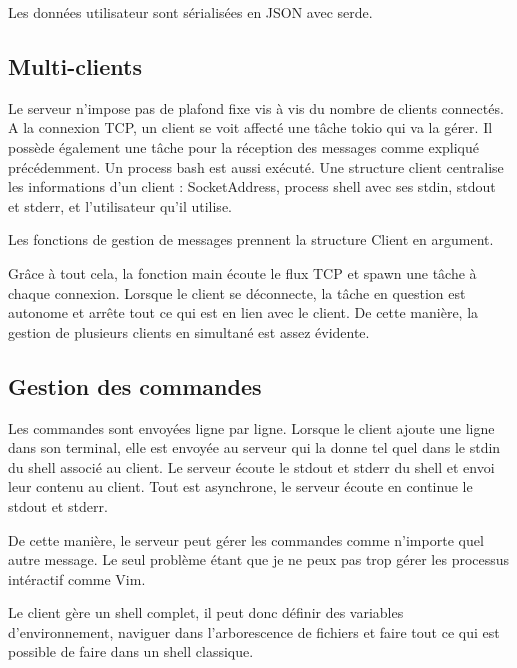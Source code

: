 \documentclass[french]{article}
\begin{document}
Les données utilisateur sont sérialisées en JSON avec serde.

\subsection{Multi-clients}

Le serveur n'impose pas de plafond fixe vis à vis du nombre de clients connectés. A la connexion TCP, un client se voit affecté une tâche tokio qui va la gérer. Il possède également une tâche pour la réception des messages comme expliqué précédemment. Un process bash est aussi exécuté. Une structure client centralise les informations d'un client : SocketAddress, process shell avec ses stdin, stdout et stderr, et l'utilisateur qu'il utilise.

\medspace

Les fonctions de gestion de messages prennent la structure Client en argument.

\medspace

Grâce à tout cela, la fonction main écoute le flux TCP et spawn une tâche à chaque connexion. Lorsque le client se déconnecte, la tâche en question est autonome et arrête tout ce qui est en lien avec le client.
De cette manière, la gestion de plusieurs clients en simultané est assez évidente.

\subsection{Gestion des commandes}

Les commandes sont envoyées ligne par ligne. Lorsque le client ajoute une ligne dans son terminal, elle est envoyée au serveur qui la donne tel quel dans le stdin du shell associé au client. Le serveur écoute le stdout et stderr du shell et envoi leur contenu au client. Tout est asynchrone, le serveur écoute en continue le stdout et stderr.

\medspace

De cette manière, le serveur peut gérer les commandes comme n'importe quel autre message. Le seul problème étant que je ne peux pas trop gérer les processus intéractif comme Vim.

\medspace

Le client gère un shell complet, il peut donc définir des variables d'environnement, naviguer dans l'arborescence de fichiers et faire tout ce qui est possible de faire dans un shell classique.
\end{document}
